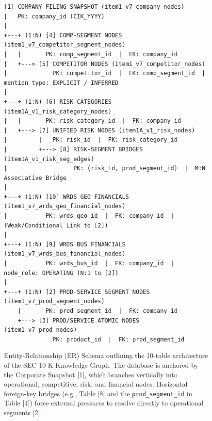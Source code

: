 \begin{figure}[t]
\centering
\scriptsize
\begin{verbatim}
[1] COMPANY FILING SNAPSHOT (item1_v7_company_nodes) 
|   PK: company_id (CIK_YYYY)
|
+---+ (1:N) [4] COMP-SEGMENT NODES (item1_v7_competitor_segment_nodes)
|   |       PK: comp_segment_id  |  FK: company_id
|   +---> [5] COMPETITOR NODES (item1_v7_competitor_nodes)
|             PK: competitor_id  |  FK: comp_segment_id  |  mention_type: EXPLICIT / INFERRED
|
+---+ (1:N) [6] RISK CATEGORIES (item1A_v1_risk_category_nodes)
|   |       PK: risk_category_id  |  FK: company_id
|   +---> [7] UNIFIED RISK NODES (item1A_v1_risk_nodes)
|         |   PK: risk_id  |  FK: risk_category_id
|         +---> [8] RISK-SEGMENT BRIDGES (item1A_v1_risk_seg_edges)
|                   PK: (risk_id, prod_segment_id)  |  M:N Associative Bridge
|
+---+ (1:N) [10] WRDS GEO FINANCIALS (item1_v7_wrds_geo_financial_nodes)
|           PK: wrds_geo_id  |  FK: company_id  |  (Weak/Conditional Link to [2])
|
+---+ (1:N) [9] WRDS BUS FINANCIALS (item1_v7_wrds_bus_financial_nodes)
|           PK: wrds_bus_id  |  FK: company_id  |  node_role: OPERATING (N:1 to [2])
|
+---+ (1:N) [2] PROD-SERVICE SEGMENT NODES (item1_v7_prod_segment_nodes)
    |       PK: prod_segment_id  |  FK: company_id
    +---> [3] PROD/SERVICE ATOMIC NODES (item1_v7_prod_nodes)
              PK: product_id  |  FK: prod_segment_id
\end{verbatim}
\caption{Entity-Relationship (ER) Schema outlining the 10-table architecture of the SEC 10-K Knowledge Graph. The database is anchored by the Corporate Snapshot [1], which branches vertically into operational, competitive, risk, and financial nodes. Horizontal foreign-key bridges (e.g., Table [8] and the \texttt{prod\_segment\_id} in Table [4]) force external pressures to resolve directly to operational segments [2].}
\label{fig:er_diagram}
\end{figure}